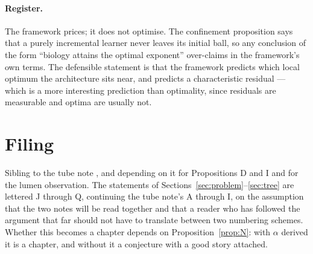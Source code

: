 \documentclass[11pt]{article}
\theoremstyle{plain}
\theoremstyle{definition}
\begin{document}
\paragraph{Register.} The framework prices; it does not optimise. The confinement proposition says
that a purely incremental learner never leaves its initial ball, so any conclusion of the form
``biology attains the optimal exponent'' over-claims in the framework's own terms. The defensible
statement is that the framework predicts which local optimum the architecture sits near, and predicts
a characteristic residual --- which is a more interesting prediction than optimality, since residuals
are measurable and optima are usually not.

\section{Filing}
\label{sec:filing}

Sibling to the tube note \cite{tubenote}, and depending on it for Propositions D and I and for the
lumen observation. The statements of Sections~\ref{sec:problem}--\ref{sec:tree} are lettered J through
Q, continuing the tube note's A through I, on the assumption that the two notes will be read together
and that a reader who has followed the argument that far should not have to translate between two
numbering schemes. Whether this becomes a chapter depends on
Proposition~\ref{prop:N}: with $\alpha$ derived it is a chapter, and without it a conjecture with a
good story attached.
\end{document}
